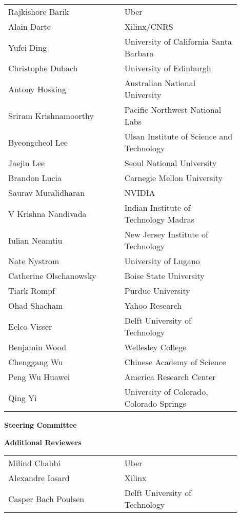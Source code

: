 \documentclass[12pt,letterpaper]{article}
\begin{document}
\begin{center}
\begin{tabular}{>{\raggedleft\arraybackslash}p{0.45\linewidth}%
>{\raggedright\arraybackslash}p{0.45\linewidth}%
}
Rajkishore Barik & Uber \\
Alain Darte & Xilinx/CNRS \\
Yufei Ding & University of California Santa Barbara \\
Christophe Dubach & University of Edinburgh \\
Antony Hosking & Australian National University \\
Sriram Krishnamoorthy & Pacific Northwest National Labs \\
Byeongcheol Lee & Ulsan Institute of Science and Technology \\
Jaejin Lee & Seoul National University \\
Brandon Lucia & Carnegie Mellon University \\
Saurav Muralidharan & NVIDIA \\
V Krishna Nandivada	& Indian Institute of Technology Madras \\
Iulian Neamtiu & New Jersey Institute of Technology \\
Nate Nystrom & University of Lugano \\
Catherine Olschanowsky & Boise State University \\
Tiark Rompf & Purdue University \\
Ohad Shacham & Yahoo Research \\
Eelco Visser & Delft University of Technology \\
Benjamin Wood & Wellesley College \\
Chenggang Wu & Chinese Academy of Science \\
Peng Wu	Huawei & America Research Center \\
Qing Yi & University of Colorado, Colorado Springs
\end{tabular}

\medskip
{\Large\sffamily\bfseries Steering Committee}
\medskip

\medskip
{\Large\sffamily\bfseries Additional Reviewers}

\begin{tabular}{>{\raggedleft\arraybackslash}p{0.45\linewidth}%
>{\raggedright\arraybackslash}p{0.45\linewidth}}
Milind Chabbi & Uber \\
Alexandre Iosard & Xilinx \\
Casper Bach Poulsen & Delft University of Technology
\end{tabular}

\end{center}
\end{document}
